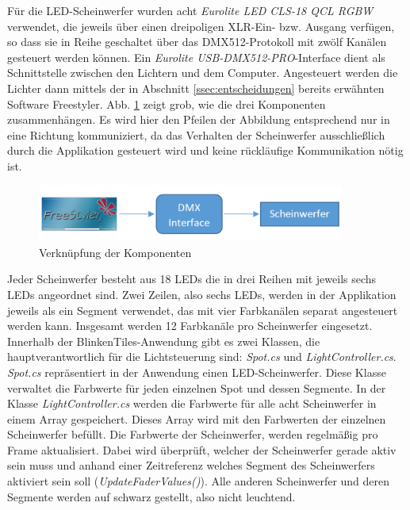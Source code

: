 \label{ssec:DMX}

Für die LED-Scheinwerfer wurden acht \emph{Eurolite LED CLS-18 QCL RGBW} verwendet, die jeweils über einen dreipoligen XLR-Ein- bzw. Ausgang verfügen, so dass sie in Reihe geschaltet über das DMX512-Protokoll mit zwölf Kanälen gesteuert werden können. Ein \emph{Eurolite USB-DMX512-PRO}-Interface dient als Schnittstelle zwischen den Lichtern und dem Computer. Angesteuert werden die Lichter dann mittels der in Abschnitt \ref{ssec:entscheidungen} bereits erwähnten Software Freestyler. Abb. \ref{fig:FStoLED} zeigt grob, wie die drei Komponenten zusammenhängen. Es wird hier den Pfeilen der Abbildung entsprechend nur in eine Richtung kommuniziert, da das Verhalten der Scheinwerfer ausschließlich durch die Applikation gesteuert wird und keine rückläufige Kommunikation nötig ist.

\begin{figure}[htbp]
	\centering
		\includegraphics[width=0.90\textwidth]{images/FStoDMXInterfaceToLEDs.PNG}
	\caption{Verknüpfung der Komponenten}
	\label{fig:FStoLED}
\end{figure}

Jeder Scheinwerfer besteht aus 18 LEDs die in drei Reihen mit jeweils sechs LEDs angeordnet sind. Zwei Zeilen, also sechs LEDs, werden in der Applikation jeweils als ein Segment verwendet, das mit vier Farbkanälen separat angesteuert werden kann. Insgesamt werden 12 Farbkanäle pro Scheinwerfer eingesetzt. Innerhalb der BlinkenTiles-Anwendung gibt es zwei Klassen, die hauptverantwortlich für die Lichtsteuerung sind: \emph{Spot.cs} und \emph{LightController.cs}. \emph{Spot.cs} repräsentiert in der Anwendung einen LED-Scheinwerfer. Diese Klasse verwaltet die Farbwerte für jeden einzelnen Spot und dessen Segmente. In der Klasse \emph{LightController.cs} werden die Farbwerte für alle acht Scheinwerfer in einem Array gespeichert. Dieses Array wird mit den Farbwerten der einzelnen Scheinwerfer befüllt. Die Farbwerte der Scheinwerfer, werden regelmäßig pro Frame aktualisiert. Dabei wird überprüft, welcher der Scheinwerfer gerade aktiv sein muss und anhand einer Zeitreferenz welches Segment des Scheinwerfers aktiviert sein soll (\emph{UpdateFaderValues()}). Alle anderen Scheinwerfer und deren Segmente werden auf schwarz gestellt, also nicht leuchtend. 

